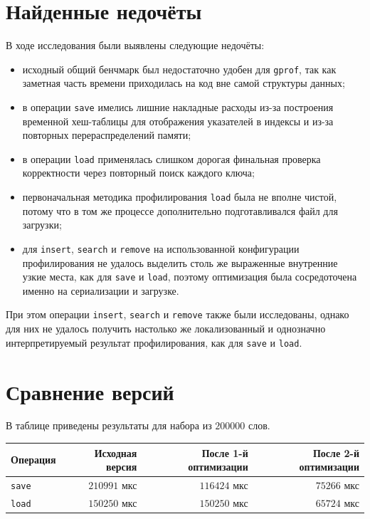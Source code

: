 \section{Найденные недочёты}

В ходе исследования были выявлены следующие недочёты:
\begin{itemize}
    \item исходный общий бенчмарк был недостаточно удобен для \texttt{gprof}, так как заметная часть времени приходилась на код вне самой структуры данных;
    \item в операции \texttt{save} имелись лишние накладные расходы из-за построения временной хеш-таблицы для отображения указателей в индексы и из-за повторных перераспределений памяти;
    \item в операции \texttt{load} применялась слишком дорогая финальная проверка корректности через повторный поиск каждого ключа;
    \item первоначальная методика профилирования \texttt{load} была не вполне чистой, потому что в том же процессе дополнительно подготавливался файл для загрузки;
    \item для \texttt{insert}, \texttt{search} и \texttt{remove} на использованной конфигурации профилирования не удалось выделить столь же выраженные внутренние узкие места, как для \texttt{save} и \texttt{load}, поэтому оптимизация была сосредоточена именно на сериализации и загрузке.
\end{itemize}

При этом операции \texttt{insert}, \texttt{search} и \texttt{remove} также были исследованы, однако для них не удалось получить настолько же локализованный и однозначно интерпретируемый результат профилирования, как для \texttt{save} и \texttt{load}.

\section{Сравнение версий}

В таблице приведены результаты для набора из \(200000\) слов.

\begin{center}
\begin{tabular}{lrrr}
\toprule
Операция & Исходная версия & После 1-й оптимизации & После 2-й оптимизации \\
\midrule
\texttt{save} & \(210991\) мкс & \(116424\) мкс & \(75266\) мкс \\
\texttt{load} & \(150250\) мкс & \(150250\) мкс & \(65724\) мкс \\
\bottomrule
\end{tabular}
\end{center}

